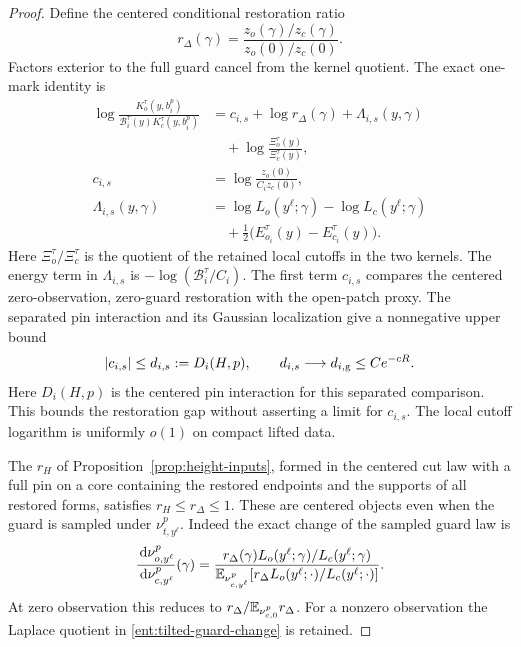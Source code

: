 \begin{proof}
Define the centered conditional restoration ratio
\[
 r_\Delta(\gamma)=
 \frac{z_o(\gamma)/z_c(\gamma)}{z_o(0)/z_c(0)}.
\]
Factors exterior to the full guard cancel from the kernel quotient.
The exact one-mark identity is
\begin{equation}\label{ent:one-mark-identity}
\begin{split}
 \log\frac{K_o^\tau(y,b_i^p)}
              {\mathcal B_i^\tau(y)K_c^\tau(y,b_i^p)}
 &=c_{i,s}+\log r_\Delta(\gamma)+\Lambda_{i,s}(y,\gamma)\\
 &\quad{}+\log\frac{\Xi_o^\tau(y)}{\Xi_c^\tau(y)},\\
 c_{i,s}&=\log\frac{z_o(0)}{C_i z_c(0)},\\
 \Lambda_{i,s}(y,\gamma)
 &=\log L_o(y^\ell;\gamma)-\log L_c(y^\ell;\gamma)\\
 &\quad{}+\tfrac12\bigl(E_{o_i}^\tau(y)-E_{c_i}^\tau(y)\bigr).
\end{split}
\end{equation}
Here \(\Xi_o^\tau/\Xi_c^\tau\) is the quotient of the retained local
cutoffs in the two kernels.  The energy term in \(\Lambda_{i,s}\)
is \(-\log(\mathcal B_i^\tau/C_i)\).  The first term \(c_{i,s}\)
compares the centered zero-observation, zero-guard restoration with
the open-patch proxy.  The separated pin interaction and its
Gaussian localization give a nonnegative upper bound
\[
 |c_{i,s}|\le d_{i,s}:=D_i(H,p),\qquad
 d_{i,s}\longrightarrow d_{i,{\rm g}}\le Ce^{-cR}.
\]
Here \(D_i(H,p)\) is the centered pin interaction for this
separated comparison.  This bounds the restoration gap without
asserting a limit for \(c_{i,s}\).
The local cutoff logarithm is uniformly \(o(1)\) on compact lifted
data.

The \(r_H\) of Proposition~\ref{prop:height-inputs}, formed in the
centered cut law with a full pin on a core containing the restored
endpoints and the supports of all restored forms, satisfies
\(r_H\le r_\Delta\le1\).  These are centered
objects even when the guard is sampled under \(\nu_{t,y^\ell}^p\).
Indeed the exact change of the sampled guard law is
\begin{equation}\label{ent:tilted-guard-change}
 \frac{\,\mathrm d\nu_{o,y^\ell}^p}{\,\mathrm d\nu_{c,y^\ell}^p}(\gamma)
 =
 \frac{r_\Delta(\gamma)L_o(y^\ell;\gamma)/L_c(y^\ell;\gamma)}
 {\mathbb E_{\nu_{c,y^\ell}^p}
       [r_\Delta L_o(y^\ell;\cdot)/L_c(y^\ell;\cdot)]}.
\end{equation}
At zero observation this reduces to
\(r_\Delta/\mathbb E_{\nu_{c,0}^p}r_\Delta\).  For a nonzero observation
the Laplace quotient in \eqref{ent:tilted-guard-change} is retained.


\end{proof}
